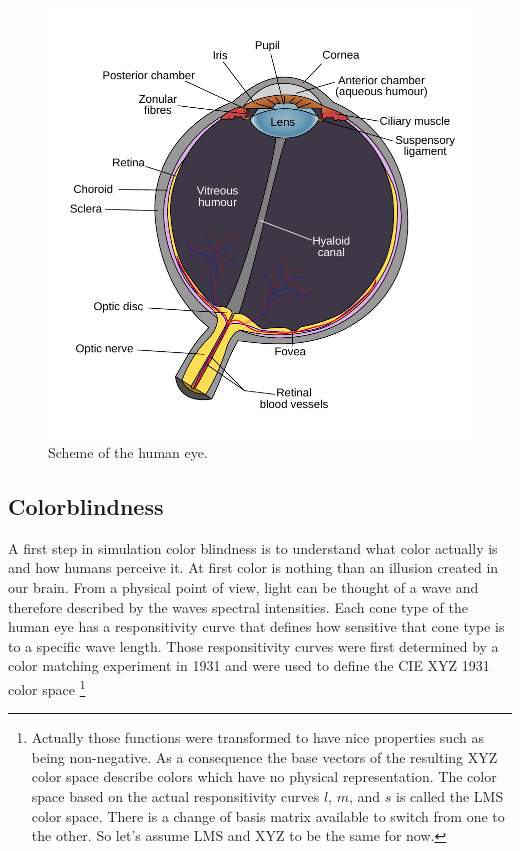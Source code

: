 \documentclass{acm_proc_article-sp}
\begin{document}
\begin{figure}
    \centering
    \includegraphics[width=\columnwidth]{human_eye_scheme.pdf}
    \caption{Scheme of the human eye.}
    \label{fig:humaneye}
\end{figure}
%
%
\subsection{Colorblindness}
A first step in simulation color blindness is to understand what color actually is and how humans perceive it.
At first color is nothing than an illusion created in our brain.
From a physical point of view, light can be thought of a wave and therefore described by the waves spectral intensities.
Each cone type of the human eye has a responsitivity curve that defines how sensitive that cone type is to a specific wave length.
Those responsitivity curves were first determined by a color matching experiment in 1931 and were used to define the CIE XYZ 1931 color space
\footnote{
    Actually those functions were transformed to have nice properties such as being non-negative.
    As a consequence the base vectors of the resulting XYZ color space describe colors which have no physical representation.
    The color space based on the actual responsitivity curves $l$, $m$, and $s$ is called the LMS color space.
    There is a change of basis matrix available to switch from one to the other.
    So let's assume LMS and XYZ to be the same for now.
}
\end{document}
